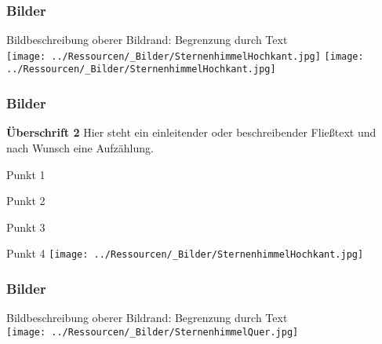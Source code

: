 \begin{frame}
    \frametitle{Bilder}
    
Bildbeschreibung\newline
oberer Bildrand: Begrenzung durch Text\\[\baselineskip]

\mbox{\texttt{[image: ../Ressourcen/\_Bilder/SternenhimmelHochkant.jpg]}}%
\hspace{6.5mm}%
\mbox{\texttt{[image: ../Ressourcen/\_Bilder/SternenhimmelHochkant.jpg]}}

\end{frame}
\clearpage


\begin{frame}
    \frametitle{Bilder}

\begin{multicols}{2}
    \textbf{Überschrift 2}\newline
    Hier steht ein einleitender oder beschreibender Fließtext und nach Wunsch
    eine Aufzählung.

    Punkt 1

    Punkt 2

    Punkt 3

    Punkt 4
    \vfill\columnbreak
    \texttt{[image: ../Ressourcen/\_Bilder/SternenhimmelHochkant.jpg]}%
\end{multicols}
    
\end{frame}
\clearpage


\begin{frame}
    \frametitle{Bilder}

Bildbeschreibung\newline
oberer Bildrand: Begrenzung durch Text\\[\baselineskip]

\texttt{[image: ../Ressourcen/\_Bilder/SternenhimmelQuer.jpg]}%

\end{frame}
\clearpage


